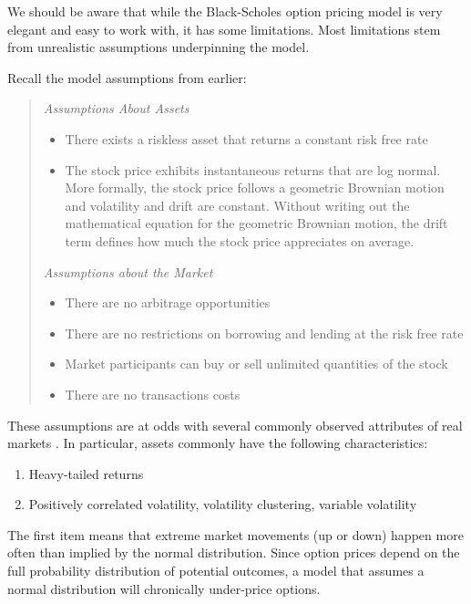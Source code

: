 \documentclass[
]{book}
\providecommand{\tightlist}{%
  \setlength{\itemsep}{0pt}\setlength{\parskip}{0pt}}
\begin{document}
We should be aware that while the Black-Scholes option pricing model is very elegant and easy to work with, it has some limitations. Most limitations stem from unrealistic assumptions underpinning the model.

Recall the model assumptions from earlier:

\begin{quote}
\emph{Assumptions About Assets}

\begin{itemize}
\item
  There exists a riskless asset that returns a constant risk free rate
\item
  The stock price exhibits instantaneous returns that are log normal. More formally, the stock price follows a geometric Brownian motion and volatility and drift are constant. Without writing out the mathematical equation for the geometric Brownian motion, the drift term defines how much the stock price appreciates on average.
\end{itemize}

\emph{Assumptions about the Market}

\begin{itemize}
\item
  There are no arbitrage opportunities
\item
  There are no restrictions on borrowing and lending at the risk free rate
\item
  Market participants can buy or sell unlimited quantities of the stock
\item
  There are no transactions costs
\end{itemize}
\end{quote}

These assumptions are at odds with several commonly observed attributes of real markets . In particular, assets commonly have the following characteristics:

\begin{enumerate}
\def\labelenumi{\arabic{enumi}.}
\tightlist
\item
  Heavy-tailed returns
\item
  Positively correlated volatility, volatility clustering, variable volatility
\end{enumerate}

The first item means that extreme market movements (up or down) happen more often than implied by the normal distribution. Since option prices depend on the full probability distribution of potential outcomes, a model that assumes a normal distribution will chronically under-price options.
\end{document}

